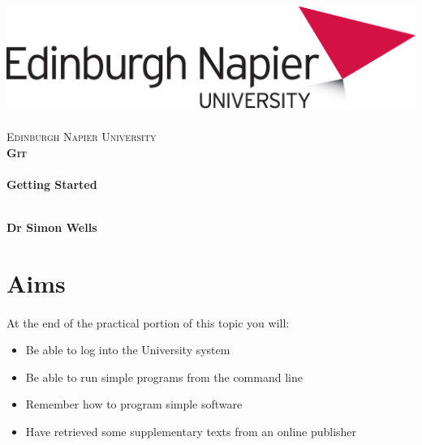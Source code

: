 \documentclass[10pt, a4paper, twosize]{article}
\begin{document}

\begin{titlepage}
\vspace*{5cm}
\begin{center}
\includegraphics[width=.5\textwidth]{images/EdNapUniLogoCMYK}~\\[1cm]

\textsc{\Large Edinburgh Napier University}\\[1.5cm]

\textsc{\LARGE \bfseries Git}\\[0.5cm]

\hrulefill \\[0.4cm]
{\huge \bfseries Getting Started \\[0.4cm] }
\hrulefill \\[1.5cm]

\begin{minipage}{0.4\textwidth}
\begin{flushleft} \large
\textbf{Dr Simon Wells} \\
\end{flushleft}
\end{minipage}

\vfill

\end{center}
\end{titlepage}




%

\section{Aims}
\paragraph{} At the end of the practical portion of this topic you will:

\begin{itemize}
\item Be able to log into the University system
\item Be able to run simple programs from the command line
\item Remember how to program simple software
\item Have retrieved some supplementary texts from an online publisher
\end{itemize}
\end{document}
